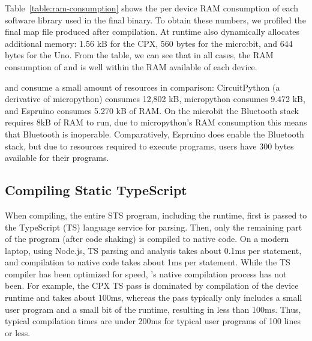 Table~\ref{table:ram-consumption} shows the per device RAM consumption of each software library used in the final \MC binary. To obtain these numbers, we profiled the final map file produced after compilation. At runtime \MC also dynamically allocates additional memory: 1.56 kB for the CPX, 560 bytes for the micro:bit, and 644 bytes for the Uno. From the table, we can see that in all cases, the RAM consumption of \MC and \CO is well within the RAM available of each device.

\MC and \CO consume a small amount of resources in comparison: CircuitPython (a derivative of micropython) consumes 12,802 kB, micropython consumes 9.472 kB, and Espruino consumes 5.270 kB of RAM. On the microbit the Bluetooth stack requires 8kB of RAM to run, due to micropython's RAM consumption this means that Bluetooth is inoperable. Comparatively, Espruino does enable the Bluetooth stack, but due to resources required to execute programs, users have 300 bytes available for their programs.





\subsection{Compiling Static TypeScript}

When compiling, the entire STS program, including the runtime, first is
passed to the TypeScript (TS) language service for parsing. Then, only the remaining part
of the program (after code shaking) is compiled to native code.
On a modern laptop, using Node.js, TS parsing and analysis takes about 0.1ms per statement, and \MC compilation to native code takes about 1ms per statement.
While the TS compiler has been optimized for speed, \MCN's native compilation process has not been. For example, the CPX TS pass is dominated by compilation of the device runtime and takes about 100ms, whereas the \MC pass typically only includes a small user program and a small bit of the runtime, resulting in less than 100ms. Thus, typical compilation times are under 200ms for typical user programs of 100 lines or less.

